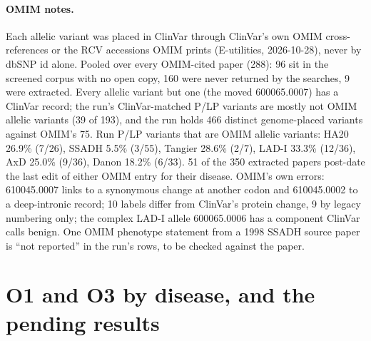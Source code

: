 \documentclass{article} %
\begin{document}
\paragraph{OMIM notes.} Each allelic variant was placed in ClinVar through ClinVar's own OMIM cross-references or the RCV accessions OMIM prints (E-utilities, 2026-10-28), never by dbSNP id alone. Pooled over every OMIM-cited paper (288): 96 sit in the screened corpus with no open copy, 160 were never returned by the searches, 9 were extracted. Every allelic variant but one (the moved 600065.0007) has a ClinVar record; the run's ClinVar-matched P/LP variants are mostly not OMIM allelic variants (39 of 193), and the run holds 466 distinct genome-placed variants against OMIM's 75. Run P/LP variants that are OMIM allelic variants: HA20 26.9\% (7/26), SSADH 5.5\% (3/55), Tangier 28.6\% (2/7), LAD-I 33.3\% (12/36), AxD 25.0\% (9/36), Danon 18.2\% (6/33). 51 of the 350 extracted papers post-date the last edit of either OMIM entry for their disease. OMIM's own errors: 610045.0007 links to a synonymous change at another codon and 610045.0002 to a deep-intronic record; 10 labels differ from ClinVar's protein change, 9 by legacy numbering only; the complex LAD-I allele 600065.0006 has a component ClinVar calls benign. One OMIM phenotype statement from a 1998 SSADH source paper is ``not reported'' in the run's rows, to be checked against the paper.

\FloatBarrier
\section{O1 and O3 by disease, and the pending results}
\label{app:o1o3}
\end{document}
